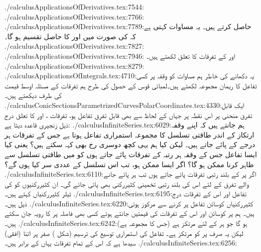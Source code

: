 
./calculusApplicationsOfDerivatives.tex:7544:
./calculusApplicationsOfDerivatives.tex:7766:
./calculusApplicationsOfDerivatives.tex:7789:حاصل کرتے ہیں۔ یہ مساوات کہتی ہے کہ  کی صورت میں    اور   کا حاصل تقسیم ہو گا۔
./calculusApplicationsOfDerivatives.tex:7827:
./calculusApplicationsOfDerivatives.tex:7946: اور  کے تفرقات کا تعلق لکھتے ہیں۔
./calculusApplicationsOfDerivatives.tex:8279:\\
./calculusApplicationsOfIntegrals.tex:4710:یہ دکھانے کی خاطر ہم مساوات  کو وقفہ  پر کسی تفاعل  کا ریمان مجموعہ لکھتے ہیں۔لمبائی قوس کے حصول کی طرح ہم تفرقات  کے مسئلہ اوسط قیمت کی طرف دیکھتے ہیں۔
./calculusConicSectionsParametrizedCurvesPolarCoordinates.tex:4330:ایک قابل تفرق منحنی پر اس نقطہ پر جہاں  کے لحاظ سے بھی  قابل تفرق تفاعل ہو، تفرقات ،  اور  کا تعلق درج ذیل زنجیری قاعدہ دیتا ہے:
./calculusInfiniteSeries.tex:6029:ہم جانتے ہیں کہ اپنے وقفہ ارتکاز کے اندر طاقتی تسلسل کا مجموعہ استمراری تفاعل ہوتا ہے جس کے تفرقات  ہر درجے کے پائے جاتے ہیں۔ لیکن کیا ہم یہی کچھ دوسری رخ بھی کہہ سکتے ہیں؟ یعنی کیا ایسا تفاعل  جس کے وقفہ  ہر رتبہ کے تفرقات پائے جاتے ہوں کو  میں طاقتی تسلسل سے ظاہر کرنا ممکن ہو گا؟ اگر ایسا ممکن ہو، تب اس تسلسل کے عددی سر کیا ہوں گے؟
./calculusInfiniteSeries.tex:6110:اگر  پر  کے بلند رتبی تفرقات پائے جاتے ہوں تب ہر پائے جانے والے تفرق کے لئے  اس کی بلند رتبی تخمینی کثیررکنی بھی پائی جائے گی۔  ان کثیررکنیوں کو  کی ٹیلر کثیررکنیاں کہتے ہیں۔
./calculusInfiniteSeries.tex:6195:تفاعل اور اس کے تفرقات درج ذیل ہیں۔
./calculusInfiniteSeries.tex:6220:کثیررکنیاں  کوسائن تفاعل پر  کرنے سے مرکوز ہوتی ہیں۔ ہم  پر کوسائن اور اس کے تفرقات کی قیمتیں جانتے ہوئے کسی بھی فاصلہ پر  کا رویہ جان سکتے ہیں۔
./calculusInfiniteSeries.tex:6242:ہو گا جو ہر  کے لئے مرتکز ہے (جس کا مجموعہ  ہے) لیکن یہ صرف  پر  کو مرتکز ہے۔  تفاعل  کی استمراری توسیع کی ترسیم (شکل ) صفر پر اتنا (افقی) سیدھا ہے کہ اس کے تمام تفرقات یہاں  کے برابر ہیں۔
./calculusInfiniteSeries.tex:6256:\caption{صفر پر تفاعل کی ترسیم اتنا (افقی) سیدھا ہے  کے یہاں اس کے تمام تفرقات  ہیں۔}
